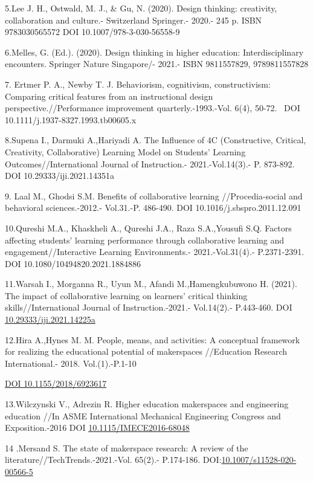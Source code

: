 5.Lee J. H., Ostwald, M. J., \& Gu, N. (2020). Design thinking:
creativity, collaboration and culture.- Switzerland Springer.- 2020.-
245 p. ISBN 9783030565572 DOI 10.1007/978-3-030-56558-9

6.Melles, G. (Ed.). (2020). Design thinking in higher education:
Interdisciplinary encounters. Springer Nature Singapore/- 2021.- ISBN
9811557829, 9789811557828

7. Ertmer P. A., Newby T. J. Behaviorism, cognitivism, constructivism:
Comparing critical features from an instructional design
perspective.//Performance improvement quarterly.-1993.-Vol. 6(4), 50-72.
~DOI 10.1111/j.1937-8327.1993.tb00605.x

8.Supena I., Darmuki A.,Hariyadi A. The Influence of 4C (Constructive,
Critical, Creativity, Collaborative) Learning Model on
Students'{} Learning Outcomes//International Journal of
Instruction.- 2021.-Vol.14(3).- P. 873-892. DOI 10.29333/iji.2021.14351a

9. Laal M., Ghodsi S.M. Benefits of collaborative learning
//Procedia-social and behavioral sciences.-2012.- Vol.31.-P. 486-490.
DOI 10.1016/j.sbspro.2011.12.091

10.Qureshi M.A., Khaskheli A., Qureshi J.A., Raza S.A.,Yousufi S.Q.
Factors affecting students' learning performance through collaborative
learning and engagement//Interactive Learning Environments.-
2021.-Vol.31(4).- P.2371-2391. DOI 10.1080/10494820.2021.1884886

11.Warsah I., Morganna R., Uyun M., Afandi M.,Hamengkubuwono H. (2021).
The impact of collaborative learning on learners' critical thinking
skills//International Journal of Instruction.-2021.- Vol.14(2).-
P.443-460. DOI
\href{http://dx.doi.org/10.29333/iji.2021.14225a}{10.29333/iji.2021.14225a}

12.Hira A.,Hynes M. M. People, means, and activities: A conceptual
framework for realizing the educational potential of makerspaces
//Education Research International.- 2018. Vol.(1).-P.1-10

\href{https://doi.org/10.1155/2018/6923617}{DOI 10.1155/2018/6923617}

13.Wilczynski V., Adrezin R. Higher education makerspaces and
engineering education //In ASME International Mechanical Engineering
Congress and Exposition.-2016 DOI
\href{http://dx.doi.org/10.1115/IMECE2016-68048}{10.1115/IMECE2016-68048}

14 .Mersand S. The state of makerspace research: A review of the
literature//TechTrends.-2021.-Vol. 65(2).- P.174-186.
DOI:\href{http://dx.doi.org/10.1007/s11528-020-00566-5}{10.1007/s11528-020-00566-5}

